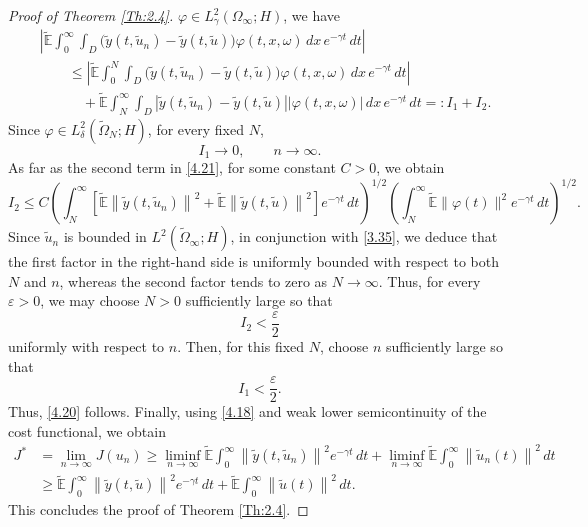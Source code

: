 \documentclass[a4paper,12pt]{article}
\numberwithin{equation}{section}
\begin{document}
\begin{proof}[Proof of Theorem \ref{Th:2.4}]
$\varphi\in L_\gamma^2(\Omega_\infty;H)$, we have
\begin{align}
&\left|
\widetilde{\mathbb{E}}
\int_0^\infty
\int_D
\bigl(
\widetilde{y}(t,\widetilde{u}_n)
-
\widetilde{y}(t,\widetilde{u})
\bigr)
\varphi(t,x,\omega)\,dx\,
e^{-\gamma t}\,dt
\right|
\nonumber\\
&\qquad\leq
\left|
\widetilde{\mathbb{E}}
\int_0^N
\int_D
\bigl(
\widetilde{y}(t,\widetilde{u}_n)
-
\widetilde{y}(t,\widetilde{u})
\bigr)
\varphi(t,x,\omega)\,dx\,
e^{-\gamma t}\,dt
\right|
\nonumber\\
&\qquad\quad+
\widetilde{\mathbb{E}}
\int_N^\infty
\int_D
\left|
\widetilde{y}(t,\widetilde{u}_n)
-
\widetilde{y}(t,\widetilde{u})
\right|
\left|
\varphi(t,x,\omega)
\right|\,dx\,
e^{-\gamma t}\,dt
=: I_1+I_2.
\label{4.21}
\end{align}
Since $\varphi\in L_\delta^2(\widetilde{\Omega}_N;H)$,
for every fixed $N$,
\begin{equation}
I_1 \to 0,
\qquad n\to\infty.
\label{4.22}
\end{equation}
As far as the second term in \eqref{4.21}, for some constant $C>0$, we
obtain
\[
I_2
\leq
C
\left(
\int_N^\infty
\left[
\widetilde{\mathbb{E}}
\left\|
\widetilde{y}(t,\widetilde{u}_n)
\right\|^2
+
\widetilde{\mathbb{E}}
\left\|
\widetilde{y}(t,\widetilde{u})
\right\|^2
\right]
e^{-\gamma t}\,dt
\right)^{1/2}
\left(
\int_N^\infty
\widetilde{\mathbb{E}}
\|\varphi(t)\|^2
e^{-\gamma t}\,dt
\right)^{1/2}.
\]
Since $\widetilde{u}_n$ is bounded in
$L^2(\widetilde{\Omega}_\infty;H)$, in conjunction with \eqref{3.35}, we deduce that the first factor in the
right-hand side is uniformly bounded with respect to both $N$ and $n$,
whereas the second factor tends to zero as $N\to\infty$. Thus, for
every $\varepsilon>0$, we may choose $N>0$ sufficiently large so that
\[
I_2<\frac{\varepsilon}{2}
\]
uniformly with respect to $n$. Then, for this fixed $N$, choose
$n$ sufficiently large so that
\[
I_1<\frac{\varepsilon}{2}.
\]
Thus, \eqref{4.20} follows. Finally, using \eqref{4.18} and weak lower semicontinuity of the cost
functional, we obtain
\[
\begin{aligned}
J^*
&=
\lim_{n\to\infty}J(u_n) \geq
\liminf_{n\to\infty}
\widetilde{\mathbb{E}}
\int_0^\infty
\left\|
\widetilde{y}(t,\widetilde{u}_n)
\right\|^2
e^{-\gamma t}\,dt
+
\liminf_{n\to\infty}
\widetilde{\mathbb{E}}
\int_0^\infty
\left\|
\widetilde{u}_n(t)
\right\|^2\,dt
\\
&\geq
\widetilde{\mathbb{E}}
\int_0^\infty
\left\|
\widetilde{y}(t,\widetilde{u})
\right\|^2
e^{-\gamma t}\,dt
+
\widetilde{\mathbb{E}}
\int_0^\infty
\left\|
\widetilde{u}(t)
\right\|^2\,dt.
\end{aligned}
\]
This concludes the proof of Theorem \ref{Th:2.4}.
\end{proof}
\end{document}

